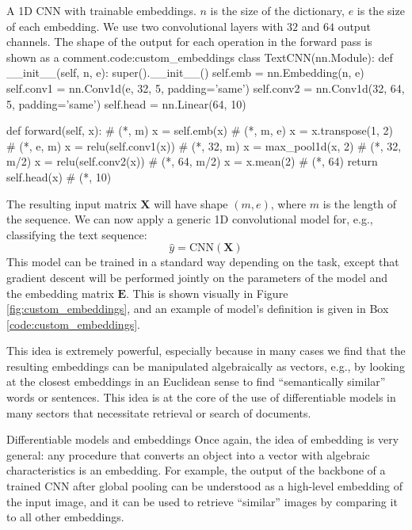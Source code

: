 \begin{mypy}{A 1D CNN with trainable embeddings. $n$ is the size of the dictionary, $e$ is the size of each embedding. We use two convolutional layers with $32$ and $64$ output channels. The shape of the output for each operation in the forward pass is shown as a comment.}{code:custom_embeddings}
class TextCNN(nn.Module):
  def __init__(self, n, e):
    super().__init__()
    self.emb = nn.Embedding(n, e)
    self.conv1 = nn.Conv1d(e, 32, 5, padding='same')
    self.conv2 = nn.Conv1d(32, 64, 5, padding='same')
    self.head = nn.Linear(64, 10)

  def forward(self, x):      # (*, m)
    x = self.emb(x)          # (*, m, e)
    x = x.transpose(1, 2)    # (*, e, m)
    x = relu(self.conv1(x))  # (*, 32, m)
    x = max_pool1d(x, 2)     # (*, 32, m/2)
    x = relu(self.conv2(x))  # (*, 64, m/2)
    x = x.mean(2)            # (*, 64)
    return self.head(x)      # (*, 10)
\end{mypy}

The resulting input matrix $\mathbf{X}$ will have shape $(m, e)$, where $m$ is the length of the sequence. We can now apply a generic 1D convolutional model for, e.g., classifying the text sequence:
%
$$
\hat{y}=\text{CNN}(\mathbf{X})
$$
%
This model can be trained in a standard way depending on the task, except that gradient descent will be performed jointly on the parameters of the model and the embedding matrix $\mathbf{E}$. This is shown visually in Figure \ref{fig:custom_embeddings}, and an example of model's definition is given in Box \ref{code:custom_embeddings}.

This idea is extremely powerful, especially because in many cases we find that the resulting embeddings can be manipulated algebraically as vectors, e.g., by looking at the closest embeddings in an Euclidean sense to find “semantically similar” words or sentences. This idea is at the core of the use of differentiable models in many sectors that necessitate retrieval or search of documents.

\begin{supportbox}{Differentiable models and embeddings}
Once again, the idea of embedding is very general: any procedure that converts an object into a vector with algebraic characteristics is an embedding. For example, the output of the backbone of a trained CNN after global pooling can be understood as a high-level embedding of the input image, and it can be used to retrieve “similar” images by comparing it to all other embeddings.
\end{supportbox}

